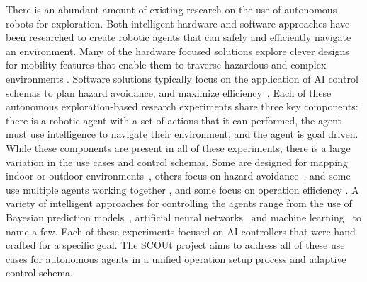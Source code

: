 There is an abundant amount of existing research on the use of autonomous robots for exploration.
Both intelligent hardware and software approaches have been researched to create robotic agents that can safely and efficiently navigate an environment.
Many of the hardware focused solutions explore clever designs for mobility features that enable them to traverse hazardous and complex environments .
Software solutions typically focus on the application of AI control schemas to plan hazard avoidance, and maximize efficiency~\cite{christensen_multi-robot_2017, tai_autonomous_2017, stachniss_exploration_2004, clark_mobile_2007, perea_strom_robust_2017, fink_tier-scalable_2007, bai_toward_2017}.
Each of these autonomous exploration-based research experiments share three key components: there is a robotic agent with a set of actions that it can performed, the agent must use intelligence to navigate their environment, and the agent is goal driven.
While these components are present in all of these experiments, there is a large variation in the use cases and control schemas.
Some are designed for mapping indoor or outdoor environments~\cite{tai_autonomous_2017,  stachniss_exploration_2004, perea_strom_robust_2017}, others focus on hazard avoidance~\cite{christensen_multi-robot_2017, fink_tier-scalable_2007}, and some use multiple agents working together \cite{christensen_multi-robot_2017, clark_mobile_2007}, and some focus on operation efficiency \cite{bai_toward_2017}.
A variety of intelligent approaches for controlling the agents range from the use of Bayesian prediction models~\cite{christensen_multi-robot_2017}, artificial neural networks~\cite{tai_autonomous_2017} and machine learning~\cite{bai_toward_2017} to name a few.
Each of these experiments focused on AI controllers that were hand crafted for a specific goal.
The SCOUt project aims to address all of these use cases for autonomous agents in a unified operation setup process and adaptive control schema.

